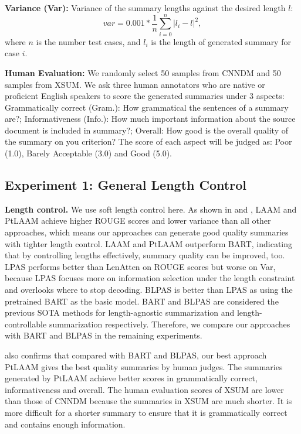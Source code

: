 \noindent\textbf{Variance (Var):} 
Variance of the summary lengths against
the desired length $l$:
\begin{equation}
var = 0.001 * \frac{1}{n}\sum_{i=0}^{n} |l_i - l|^2, 
\end{equation}
where $n$ is the number test cases, and $l_i$ is the length of 
generated summary for case $i$. 

\noindent\textbf{Human Evaluation:}
We randomly select 50 samples from CNNDM and 50 samples from XSUM.
We ask three human annotators
who are native or proficient English speakers to score 
the generated summaries under 3 aspects: 
Grammatically correct (Gram.): How grammatical the sentences of a summary are?; Informativeness (Info.): How much important information about the source document is included in summary?; Overall: How good is the overall quality of the summary on you criterion?
The score of each aspect will be judged as: Poor (1.0), Barely Acceptable (3.0) and Good (5.0). 

\subsection{Experiment 1: General Length Control}
\label{sec:general}

\textbf{Length control.}
We use soft length control here.
As shown in  and , LAAM and PtLAAM
achieve higher ROUGE scores
and lower variance than all other approaches,
which means our approaches can generate good quality summaries with tighter length control.
LAAM and PtLAAM outperform BART, indicating
that by controlling lengths effectively, summary quality can be improved, too. 
LPAS performs better than LenAtten on ROUGE scores but worse on Var,
because LPAS focuses more on information selection under the length constraint 
and overlooks where to stop decoding.
BLPAS is better than LPAS as using the pretrained BART as the basic model.
BART and BLPAS are considered the previous SOTA methods for length-agnostic 
summarization and length-controllable summarization respectively.
Therefore, we compare our approaches with BART and BLPAS in the 
remaining experiments.

 also confirms that compared with BART and BLPAS,
our best approach PtLAAM gives the best quality summaries by human judges.
The summaries generated by PtLAAM achieve better scores in grammatically correct, informativeness and overall.
The human evaluation scores of XSUM are lower than those of CNNDM because the summaries in XSUM are much shorter.
It is more difficult for a shorter summary to ensure that it is grammatically correct and contains enough information.

